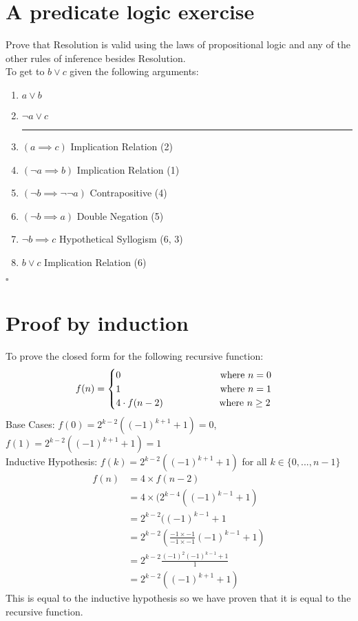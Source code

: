 \documentclass{article}
\begin{document}
\section{A predicate logic exercise}
Prove that Resolution is valid using the laws of propositional logic and any of the other rules of inference besides Resolution. \\
To get to $b \lor c$ given the following arguments: \\
\begin{enumerate}[label =(\arabic*), ref = \arabic*]
\item $a \lor b$ 
\item $\neg a \lor c$ 
\vspace{5pt} \hrule \vspace{5pt}
\item $(a \implies c)$ \hfill Implication Relation (2) 
\item $(\neg a \implies b)$ \hfill Implication Relation (1) 
\item $(\neg b \implies \neg \neg a)$ \hfill Contrapositive (4) 
\item $(\neg b \implies a)$ \hfill Double Negation (5) 
\item $\neg b \implies c$ \hfill Hypothetical Syllogism (6, 3) 
\item $b \lor c$ \hfill Implication Relation (6) 
\end{enumerate}
\hfill $\square$

\section{Proof by induction}
To prove the closed form for the following recursive function: $$ f(n) = 
    \begin{cases}
    0 \hspace{100px} \text{ where } n = 0 \\
    1 \hspace{100px} \text{ where } n = 1 \\
    4 \cdot f(n-2) \hspace{55px} \text{ where } n \geq 2
    \end{cases} 
    $$
Base Cases: $f(0) = 2^{k-2}((-1)^{k+1}+1) = 0$, $f(1) = 2^{k-2}((-1)^{k+1}+1) = 1$ \\
    Inductive Hypothesis: $f(k) = 2^{k-2}((-1)^{k+1}+1)$ for all $k \in \{0,...,n-1\}$
    \begin{equation}
        \begin{split}
            f(n) &= 4 \times f(n-2)\\
            &= 4 \times (2^{k-4}((-1)^{k-1}+1) \\
            &= 2^{k-2}((-1)^{k-1}+1 \\
            &= 2^{k-2}(\frac{-1 \times -1}{-1 \times -1}(-1)^{k-1}+1) \\
            &= 2^{k-2}\frac{(-1)^2(-1)^{k-1}+1}{1}\\
            &= 2^{k-2}((-1)^{k+1}+1)
        \end{split}
    \end{equation}
    This is equal to the inductive hypothesis so we have proven that it is equal to the recursive function.
    
\end{document}
